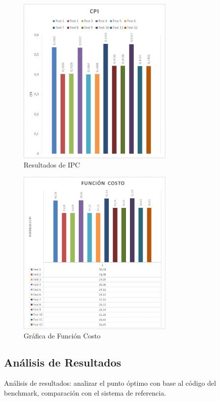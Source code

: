 \documentclass[journal]{IEEEtran}
\begin{document}
\begin{figure}[!ht]
        \begin{center}
        \includegraphics[width=3in]{fig2.png}
        \caption{Resultados de IPC}
        \end{center}
\end{figure}

\begin{figure}[!ht]
        \begin{center}
        \includegraphics[width=3in]{fig3.png}
        \caption{Gr\'{a}fica de Funci\'{o}n Costo}
        \end{center}
\end{figure}

\subsection{An\'{a}lisis de Resultados}
An\'{a}lisis de resultados: analizar el punto \'{o}ptimo con base al c\'{o}digo del benchmark, comparaci\'{o}n con el sistema de referencia.
\end{document}

